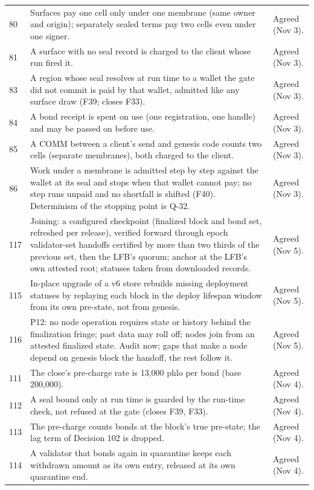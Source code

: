 \documentclass[11pt]{article}
\begin{document}
\begin{longtable}{@{}P{0.8cm}P{9.4cm}P{4.8cm}@{}}
80 & Surfaces pay one cell only under one membrane (same owner and origin); separately sealed terms pay two cells even under one signer. & Agreed (Nov 3). \\
81 & A surface with no seal record is charged to the client whose run fired it. & Agreed (Nov 3). \\
83 & A region whose seal resolves at run time to a wallet the gate did not commit is paid by that wallet, admitted like any surface draw (F39; closes F33). & Agreed (Nov 3). \\
84 & A bond receipt is spent on use (one registration, one handle) and may be passed on before use. & Agreed (Nov 3). \\
85 & A COMM between a client's send and genesis code counts two cells (separate membranes), both charged to the client. & Agreed (Nov 3). \\
86 & Work under a membrane is admitted step by step against the wallet at its seal and stops when that wallet cannot pay; no step runs unpaid and no shortfall is shifted (F40). Determinism of the stopping point is Q-32. & Agreed (Nov 3). \\
117 & Joining: a configured checkpoint (finalized block and bond set, refreshed per release), verified forward through epoch validator-set handoffs certified by more than two thirds of the previous set, then the LFB's quorum; anchor at the LFB's own attested root; statuses taken from downloaded records. & Agreed (Nov 5). \\
115 & In-place upgrade of a v6 store rebuilds missing deployment statuses by replaying each block in the deploy lifespan window from its own pre-state, not from genesis. & Agreed (Nov 5). \\
116 & P12: no node operation requires state or history behind the finalization fringe; past data may roll off; nodes join from an attested finalized state. Audit now; gaps that make a node depend on genesis block the handoff, the rest follow it. & Agreed (Nov 5). \\
111 & The close's pre-charge rate is 13{,}000 phlo per bond (base 200{,}000). & Agreed (Nov 4). \\
112 & A seal bound only at run time is guarded by the run-time check, not refused at the gate (closes F39, F33). & Agreed (Nov 4). \\
113 & The pre-charge counts bonds at the block's true pre-state; the lag term of Decision 102 is dropped. & Agreed (Nov 4). \\
114 & A validator that bonds again in quarantine keeps each withdrawn amount as its own entry, released at its own quarantine end. & Agreed (Nov 4). \\

\end{longtable}
\end{document}
